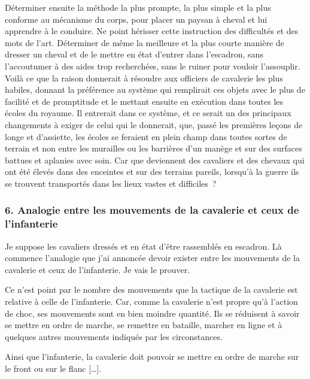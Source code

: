 \documentclass[french,twoside]{book} %
\begin{document}
Déterminer ensuite la méthode la plus prompte, la plus simple et la plus conforme au mécanisme du corps, pour placer un paysan à cheval et lui apprendre à le conduire. Ne point hérisser cette instruction des difficultés et des mots de l’art. Déterminer de même la meilleure et la plus courte manière de dresser un cheval et de le mettre en état d’entrer dans l’escadron, sans l’accoutumer à des aides trop recherchées, sans le ruiner pour vouloir l’assouplir. Voilà ce que la raison donnerait à résoudre aux officiers de cavalerie les plus habiles, donnant la préférence au système qui remplirait ces objets avec le plus de facilité et de promptitude et le mettant ensuite en exécution dans toutes les écoles du royaume. Il entrerait dans ce système, et ce serait un des principaux changements à exiger de celui qui le donnerait, que, passé les premières leçons de longe et d’assiette, les écoles se feraient en plein champ dans toutes sortes de terrain et non entre les murailles ou les barrières d’un manège et sur des surfaces battues et aplanies avec soin. Car que deviennent des cavaliers et des chevaux qui ont été élevés dans des enceintes et sur des terrains pareils, lorsqu’à la guerre ils se trouvent transportés dans les lieux vastes et difficiles ?
\subsubsection[{6. Analogie entre les mouvements de la cavalerie et ceux de l’infanterie}]{6. Analogie entre les mouvements de la cavalerie et ceux de l’infanterie}
\noindent Je suppose les cavaliers dressés et en état d’être rassemblés en escadron. Là commence l’analogie que j’ai annoncée devoir exister entre les mouvements de la cavalerie et ceux de l’infanterie. Je vais le prouver.\par
Ce n’est point par le nombre des mouvements que la tactique de la cavalerie est relative à celle de l’infanterie. Car, comme la cavalerie n’est propre qu’à l’action de choc, ses mouvements sont en bien moindre quantité. Ils se réduisent à savoir se mettre en ordre de marche, se remettre en bataille, marcher en ligne et à quelques autres mouvements indiqués par les circonstances.\par
Ainsi que l’infanterie, la cavalerie doit pouvoir se mettre en ordre de marche sur le front ou sur le flanc […].
\end{document}
